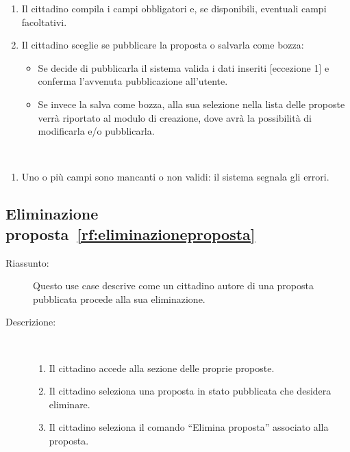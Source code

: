 \begin{ucscope}
\begin{description}
\begin{enumerate}
\begin{itemize}
      \item Categoria
    \end{itemize}

    \item Il cittadino compila i campi obbligatori e, se disponibili, eventuali campi facoltativi.

    \item Il cittadino sceglie se pubblicare la proposta o salvarla come bozza:
    \begin{itemize}
      \item Se decide di pubblicarla il sistema valida i dati inseriti [eccezione 1] e conferma l’avvenuta pubblicazione all’utente.

      \item Se invece la salva come bozza, alla sua selezione nella lista delle proposte verrà riportato al modulo di creazione, dove avrà la possibilità di modificarla e/o pubblicarla.
    \end{itemize}
  \end{enumerate}

  \item[Eccezioni:]~
  \begin{enumerate}
    \item Uno o più campi sono mancanti o non validi: il sistema segnala gli errori.
  \end{enumerate}
\end{description}

\subsection{Eliminazione proposta~\ref{rf:eliminazioneproposta}}

\begin{description}
  \item[Riassunto:] Questo use case descrive come un cittadino autore di una proposta pubblicata procede alla sua eliminazione.

  \item[Descrizione:]~
  \begin{enumerate}
    \item Il cittadino accede alla sezione delle proprie proposte.

    \item Il cittadino seleziona una proposta in stato pubblicata che desidera eliminare.

    \item Il cittadino seleziona il comando ``Elimina proposta'' associato alla proposta.


\end{enumerate}
\end{description}
\end{ucscope}
